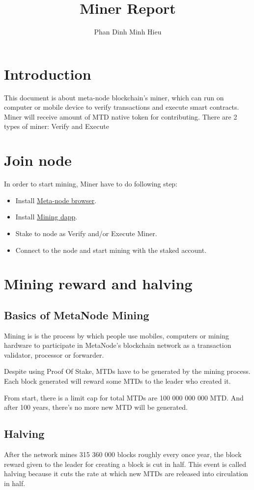 \documentclass[a4paper, 11pt]{article}
\title{Miner Report}
\author{Phan Dinh Minh Hieu}
\begin{document}
\maketitle
\tableofcontents
\pagebreak

\section{Introduction}

This document is about meta-node blockchain's miner, which can run on computer or mobile device 
to verify transactions and execute smart contracts.
Miner will receive amount of MTD native token for contributing. \linebreak
There are 2 types of miner: Verify and Execute
\pagebreak

\section{Join node}
In order to start mining, Miner have to do following step:
\begin{itemize}
    \item Install \href{http://https://metanode.co/}{Meta-node browser}.
    \item Install \href{http://https://metanode.co/}{Mining dapp}.
    \item Stake to node as Verify and/or Execute Miner.
    \item Connect to the node and start mining with the staked account.
  \end{itemize}
\pagebreak
\section{Mining reward and halving}
\subsection{Basics of MetaNode Mining}
Mining is is the process by which people use mobiles, computers or mining hardware 
to participate in MetaNode's blockchain network as a transaction validator, processor or forwarder.


Despite using Proof Of Stake, MTDs have to be generated by the mining process. Each block generated will reward some MTDs to the leader who created it.

From start, there is a limit cap for total MTDs are 100 000 000 000 MTD. And after 100 years, there's no more new MTD will be generated.
\subsection{Halving}
After the network mines 315 360 000 blocks roughly every once year, the block reward given to the leader for creating a block is cut in half. This event is called halving because it cuts the rate at which new MTDs are released into circulation in half.
\end{document}
